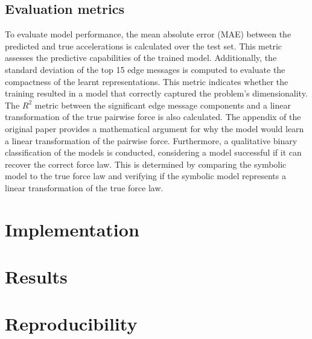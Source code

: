 \documentclass[11pt]{article}
\begin{document}
\subsection{Evaluation metrics}
To evaluate model performance, the mean absolute error (MAE) between the predicted and true accelerations is calculated over the test set. This metric assesses the predictive capabilities of the trained model. Additionally, the standard deviation of the top 15 edge messages is computed to evaluate the compactness of the learnt representations. This metric indicates whether the training resulted in a model that correctly captured the problem's dimensionality. The $R^2$ metric between the significant edge message components and a linear transformation of the true pairwise force is also calculated. The appendix of the original paper provides a mathematical argument for why the model would learn a linear transformation of the pairwise force. Furthermore, a qualitative binary classification of the models is conducted, considering a model successful if it can recover the correct force law. This is determined by comparing the symbolic model to the true force law and verifying if the symbolic model represents a linear transformation of the true force law.

\section{Implementation}

\section{Results}


\section{Reproducibility}
\end{document}
